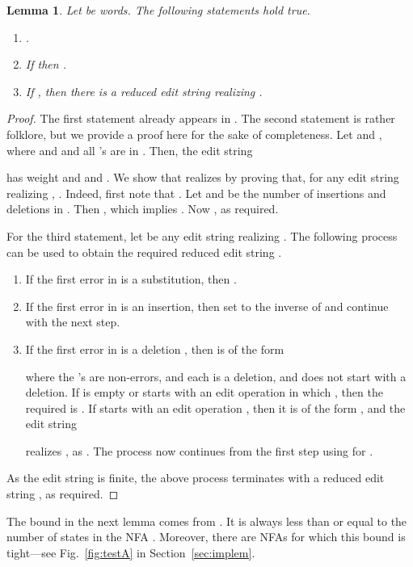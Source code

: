 \documentclass{article}
\theoremstyle{plain}
\newtheorem{lemma}[theorem]{Lemma}
\theoremstyle{definition}
\theoremstyle{remark}
\begin{document}
\begin{lemma}\label{lem:didist}
Let  be words. The following statements hold true.
\begin{enumerate}
\item
.
\item
If  then .
\item
If , then there is a reduced edit string 
realizing .
\end{enumerate}
\end{lemma}
\begin{proof}
The first statement already appears in \cite{Levenshtein:66:en}. The second statement
is rather folklore, but we provide a proof here for the sake of completeness.
Let  and , where  and  and all 's are in . Then, the edit
string

has weight  and  and .
We show that  realizes  by proving that,
for any edit string  realizing ,
. Indeed, first note that
. Let  and  be the number
of insertions and deletions in . Then ,
which implies . Now , as required.
\par
For the third statement, let  be any edit string
realizing . The following process can be used
to obtain the required reduced edit string .
\begin{enumerate}
  \item If the first error in  is a substitution, then .
  \item If the first error in  is an insertion, then  set  to the inverse of  and continue with
      the next step.
  \item If the first error in  is a deletion , then  is of the form
      
      where the 's are non-errors,  and each
       is a deletion, and 
      does not start with a deletion. If  is empty or starts with an edit operation  in which , then the required  is . If 
      starts with an edit operation , then it is of the form , and the
      edit string
      
      realizes , as  . The process now continues from the first step using  for .
\end{enumerate}
As the edit string  is finite, the above process
terminates with a reduced edit string , as required.
\end{proof}

The bound  in the next lemma comes from
\cite{Kon:2007}. It is always less than or equal to
the number of states in the NFA . Moreover, there are NFAs for which this bound is tight---see Fig.~\ref{fig:testA}
in Section~\ref{sec:implem}.
\end{document}
